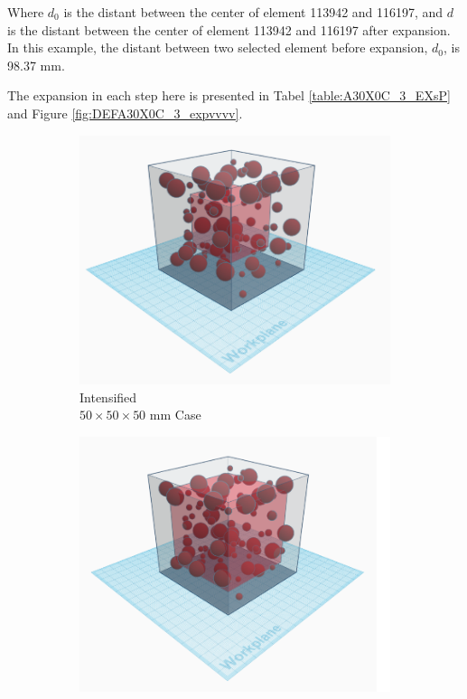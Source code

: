 Where $d_0$ is the distant between the center of element 113942 and 116197, and $d$ is the distant between the center of element 113942 and 116197 after expansion. In this example, the distant between two selected element before expansion, $d_0$, is 98.37 mm.

The expansion in each step here is presented in Tabel \ref{table:A30X0C_3_EXsP} and Figure \ref{fig:DEFA30X0C_3_expvvvv}.

\begin{figure}[ht]
\centering
    \begin{subfigure}{.33\textwidth}
      \centering
      \includegraphics[width=.8\linewidth]{Files/DEF_X/X0_3d.png}
      \caption{Intensified  \\ $50 \times 50 \times 50$ mm Case}
    \end{subfigure}%
    \begin{subfigure}{.33\textwidth}
      \centering
      \includegraphics[width=.8\linewidth]{Files/DEF_X/X-5_3d.png}

\end{subfigure}
\end{figure}
